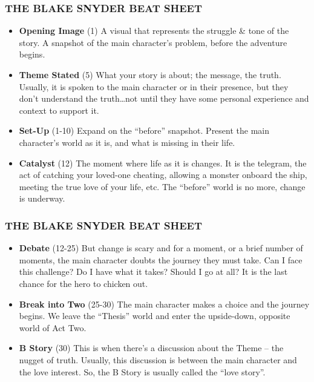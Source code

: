 \documentclass{beamer}
\begin{document}
\begin{frame}\frametitle{THE BLAKE SNYDER BEAT SHEET}

\begin{itemize}
\item {\bf Opening Image} (1) A visual that represents the struggle \& tone
  of the story. A snapshot of the main character’s problem, before the
  adventure begins.  
\item {\bf Theme Stated} (5) What your story is about; the message, the
  truth. Usually, it is spoken to the main character or in their
  presence, but they don’t understand the truth…not until they have
  some personal experience and context to support it. 
\item {\bf Set-Up} (1-10) Expand on the ``before'' snapshot. Present the main
  character’s world as it is, and what is missing in their life. 
\item {\bf Catalyst} (12) The moment where life as it is changes. It is the
  telegram, the act of catching your loved-one cheating, allowing a
  monster onboard the ship, meeting the true love of your life,
  etc. The “before” world is no more, change is underway.
\end{itemize}
\end{frame}
\begin{frame}\frametitle{THE BLAKE SNYDER BEAT SHEET}
\begin{itemize}
\item {\bf Debate} (12-25)  But change is scary and for a moment, or a brief
  number of moments, the main character doubts the journey they must
  take. Can I face this challenge? Do I have what it takes? Should I
  go at all? It is the last chance for the hero to chicken out. 
\item {\bf Break into Two} (25-30) The main character makes a choice and the
  journey begins. We leave the ``Thesis'' world and enter the
  upside-down, opposite world of Act Two. 
\item {\bf B Story} (30)  This is when there’s a discussion about the Theme
  – the nugget of truth. Usually, this discussion is between the main
  character and the love interest. So, the B Story is usually called
  the ``love story''. 
\end{itemize}
\end{frame}
\end{document}
